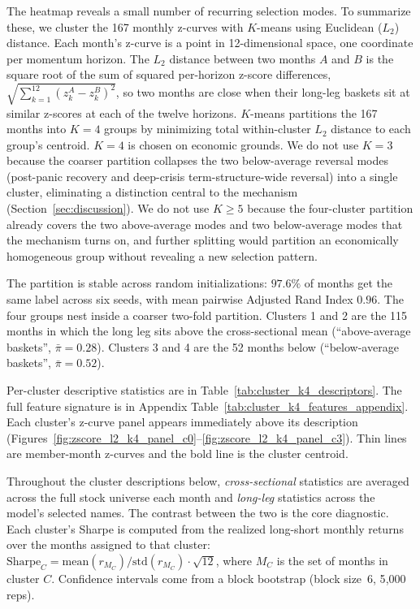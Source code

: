 The heatmap reveals a small number of recurring selection modes. To summarize these, we cluster the 167 monthly z-curves with $K$-means using Euclidean ($L_2$) distance. Each month's z-curve is a point in 12-dimensional space, one coordinate per momentum horizon. The $L_2$ distance between two months $A$ and $B$ is the square root of the sum of squared per-horizon z-score differences, $\sqrt{\sum_{k=1}^{12}(z_k^{A} - z_k^{B})^2}$, so two months are close when their long-leg baskets sit at similar z-scores at each of the twelve horizons. $K$-means partitions the 167 months into $K=4$ groups by minimizing total within-cluster $L_2$ distance to each group's centroid. $K=4$ is chosen on economic grounds. We do not use $K=3$ because the coarser partition collapses the two below-average reversal modes (post-panic recovery and deep-crisis term-structure-wide reversal) into a single cluster, eliminating a distinction central to the mechanism (Section~\ref{sec:discussion}). We do not use $K \geq 5$ because the four-cluster partition already covers the two above-average modes and two below-average modes that the mechanism turns on, and further splitting would partition an economically homogeneous group without revealing a new selection pattern.

The partition is stable across random initializations: $97.6\%$ of months get the same label across six seeds, with mean pairwise Adjusted Rand Index $0.96$. The four groups nest inside a coarser two-fold partition. Clusters 1 and 2 are the 115 months in which the long leg sits above the cross-sectional mean (``above-average baskets'', $\bar\pi = 0.28$). Clusters 3 and 4 are the 52 months below (``below-average baskets'', $\bar\pi = 0.52$).

Per-cluster descriptive statistics are in Table~\ref{tab:cluster_k4_descriptors}. The full feature signature is in Appendix Table~\ref{tab:cluster_k4_features_appendix}. Each cluster's z-curve panel appears immediately above its description (Figures~\ref{fig:zscore_l2_k4_panel_c0}--\ref{fig:zscore_l2_k4_panel_c3}). Thin lines are member-month z-curves and the bold line is the cluster centroid.

Throughout the cluster descriptions below, \emph{cross-sectional} statistics are averaged across the full stock universe each month and \emph{long-leg} statistics across the model's selected names. The contrast between the two is the core diagnostic. Each cluster's Sharpe is computed from the realized long-short monthly returns over the months assigned to that cluster: $\mathrm{Sharpe}_C = \mathrm{mean}(r_{M_C}) / \mathrm{std}(r_{M_C}) \cdot \sqrt{12}$, where $M_C$ is the set of months in cluster $C$. Confidence intervals come from a block bootstrap (block size~6, 5{,}000 reps).

